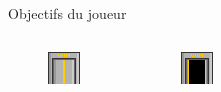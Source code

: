 \documentclass{beamer}
\begin{document}
{\begin{frame}{Objectifs du joueur}
\begin{columns}
\begin{columns}
\begin{figure}
                \includegraphics[width=1\textwidth]{exit}
            \end{figure}
            \begin{figure}
                \centering
                \includegraphics[width=1\textwidth]{images/exit_open}
            \end{figure}
        \end{columns}
    \end{columns}
\end{frame}

}
\end{document}
